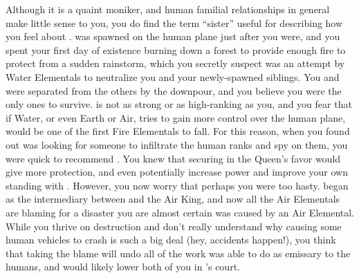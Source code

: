 \documentclass[char]{elementals}
\begin{document}
Although it is a quaint moniker, and human familial relationships in general make little sense to you, you do find the term ``sister'' useful for describing how you feel about \cJuliet{}.  \cJuliet{\They} was spawned on the human plane just after you were, and you spent your first day of existence burning down a forest to provide enough fire to protect \cJuliet{\them} from a sudden rainstorm, which you secretly suspect was an attempt by Water Elementals to neutralize you and your newly-spawned siblings.  You and \cJuliet{} were separated from the others by the downpour, and you believe you were the only ones to survive. \cJuliet{\They} is not as strong or as high-ranking as you, and you fear that if Water, or even Earth or Air, tries to gain more control over the human plane, \cJuliet{\they} would be one of the first Fire Elementals to fall. For this reason, when you found out \cQueen{} was looking for someone to infiltrate the human ranks and spy on them, you were quick to recommend \cJuliet{}.  You knew that securing \cJuliet{\them} in the Queen's favor would give \cJuliet{\them} more protection, and even potentially increase \cJuliet{\their} power and improve your own standing with \cQueen{}.  However, you now worry that perhaps you were too hasty.  \cJuliet{} began as the intermediary between \cQueen{} and the Air King, and now all the Air Elementals are blaming \cJuliet{\them} for a disaster you are almost certain was caused by an Air Elemental.  While you thrive on destruction and don't really understand why causing some human vehicles to crash is such a big deal (hey, accidents happen!), you think that \cJuliet{} taking the blame will undo all of the work \cJuliet{\they} was able to do as emissary to the humans, and would likely lower both of you in \cQueen{}'s court.
\end{document}
